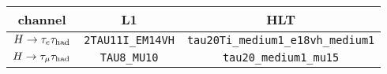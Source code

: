 \begin{tabular}{c|c|c}
  channel      & L1                       & HLT \\
  \hline\hline
  $H\rightarrow\tau_e \tau_\text{had}$ & \texttt{2TAU11I\_EM14VH} & \texttt{tau20Ti\_medium1\_e18vh\_medium1} \\
  $H\rightarrow\tau_\mu \tau_\text{had}$ & \texttt{TAU8\_MU10}      & \texttt{tau20\_medium1\_mu15}             \\
  \hline\hline
\end{tabular}
